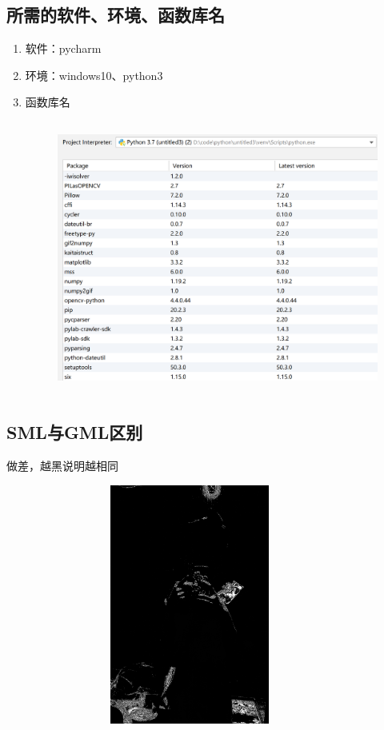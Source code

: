 \documentclass{article}
\begin{document}
\subsection{所需的软件、环境、函数库名}

\begin{enumerate}
    \item 软件：pycharm
    \item 环境：windows10、python3
    \item 函数库名
    \begin{figure}[h!]
                \centering
                \includegraphics[width=14cm,height=9cm]{python.png}
    \end{figure}
\end{enumerate}
\newpage
\subsection{SML与GML区别}
做差，越黑说明越相同
\begin{figure}[h!]
                \centering
                \includegraphics[width=10cm,height=7.9cm]{xuan22.png}
    \end{figure}
\end{document}
